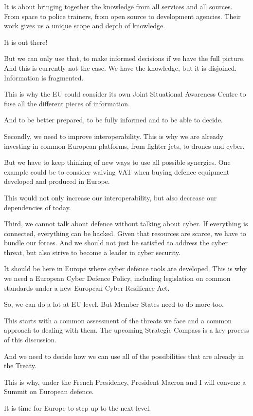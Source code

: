 \documentclass[a4paper,11pt]{article}
\begin{document}
It is about bringing together the knowledge from all services and all sources. From space to police trainers, from open source to development agencies. Their work gives us a unique scope and depth of knowledge.

It is out there!

But we can only use that, to make informed decisions if we have the full picture. And this is currently not the case. We have the knowledge, but it is disjoined. Information is fragmented.

This is why the EU could consider its own Joint Situational Awareness Centre to fuse all the different pieces of information. 

And to be better prepared, to be fully informed and to be able to decide.

Secondly, we need to improve interoperability. This is why we are already investing in common European platforms, from fighter jets, to drones and cyber.

But we have to keep thinking of new ways to use all possible synergies.  One example could be to consider waiving VAT when buying defence equipment developed and produced in Europe.

This would not only increase our interoperability, but also decrease our dependencies of today.

Third, we cannot talk about defence without talking about cyber. If everything is connected, everything can be hacked. Given that resources are scarce, we have to bundle our forces. And we should not just be satisfied to address the cyber threat, but also strive to become a leader in cyber security.

It should be here in Europe where cyber defence tools are developed. This is why we need a European Cyber Defence Policy, including legislation on common standards under a new European Cyber Resilience Act.

So, we can do a lot at EU level. But Member States need to do more too.

This starts with a common assessment of the threats we face and a common approach to dealing with them. The upcoming Strategic Compass is a key process of this discussion.  

And we need to decide how we can use all of the possibilities that are already in the Treaty.

This is why, under the French Presidency, President Macron and I will convene a Summit on European defence.

It is time for Europe to step up to the next level.
\end{document}
